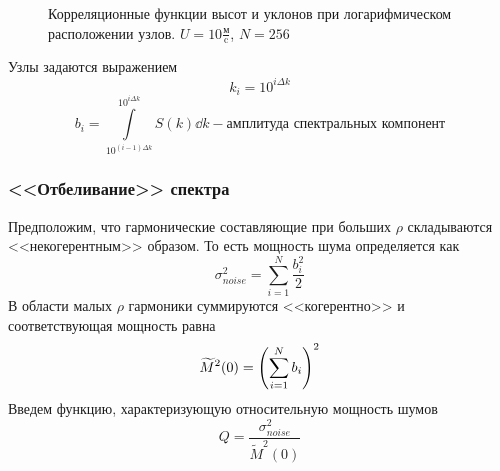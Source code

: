 \documentclass[10pt,pdf,hyperref={unicode}, dvipsnames]{beamer}
\newcommand{\tM}{\widetilde{M}}
\begin{document}
\begin{frame}[t]
\begin{figure}[h!]
\begin{minipage}{0.49\linewidth}
			\label{fig:ca1}		
	\end{minipage}
	\caption{Корреляционные функции высот и уклонов при логарифмическом расположении узлов. $U=10 \frac{\text{м}}{\text{c}}$, $N=256$}
\end{figure}
	Узлы задаются выражением
	\begin{equation}
		k_i=10^{i \Delta k}
	\end{equation}
	\begin{equation*}
	b_i = \int\limits_{10^{(i-1)\Delta k}}^{10^{i \Delta k}} S(k) \dd{k} -
	\text{амплитуда спектральных компонент}
	\end{equation*}

\end{frame}



\begin{frame}[t]
\frametitle{<<Отбеливание>> спектра}
    Предположим, что гармонические составляющие при больших $\rho$ складываются <<некогерентным>> образом. То есть  мощность шума определяется как
    \begin{equation}
    	\sigma^2_{noise}= \sum_{i=1}^N \frac{b_i^2}{2}
    \end{equation}
    В области малых $\rho$ гармоники суммируются <<когерентно>> и соответствующая мощность равна
    \begin{equation}
    	\tM^2(0)=\qty(\sum_{i=1}^N b_i)^2
    \end{equation}
    Введем функцию, характеризующую относительную мощность шумов
    \begin{equation}
    	\label{eq:Q}
    	Q=\frac{\sigma^2_{noise}}{\tM^2(0)}
    \end{equation}


\end{frame}
\end{document}
